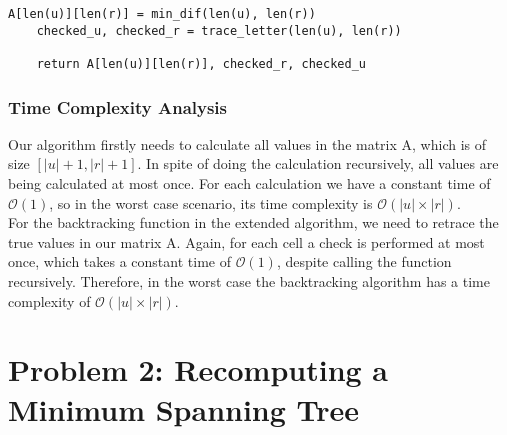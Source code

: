 \documentclass[a4paper,11pt]{article}
\begin{document}
\begin{lstlisting}[caption={Returning positioning},label={2nd1_2}]
    A[len(u)][len(r)] = min_dif(len(u), len(r))
    checked_u, checked_r = trace_letter(len(u), len(r))

    return A[len(u)][len(r)], checked_r, checked_u
\end{lstlisting}

\section{Time Complexity Analysis}

Our algorithm firstly needs to calculate all values in the matrix A, which is of size $[|u|+1,|r|+1]$. In spite of doing the calculation recursively, all values are being calculated at most once. For each calculation we have a constant time of $\mathcal{O}(1)$, so in the worst case scenario, its time complexity is $\mathcal{O}(|u|\times |r|)$.\\

For the backtracking function in the extended algorithm, we need to retrace the true values in our matrix A. Again, for each cell a check is performed at most once, which takes a constant time of $\mathcal{O}(1)$, despite calling the function recursively. Therefore, in the worst case the backtracking algorithm has a time complexity of $\mathcal{O}(|u|\times |r|)$.\\
\newpage












\part{Problem 2: Recomputing a Minimum Spanning Tree}
\end{document}
